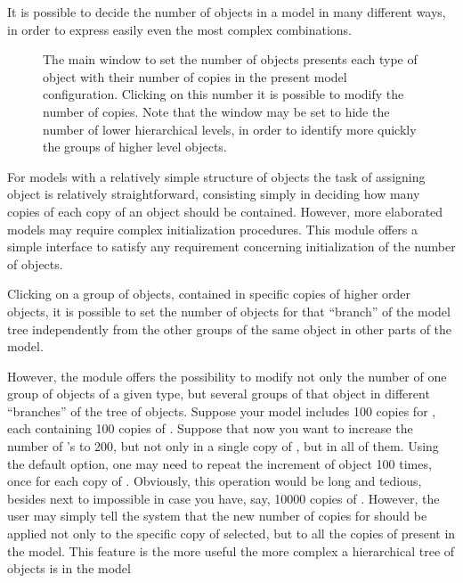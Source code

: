\documentclass [11pt,a4paper] {book}
\begin{document}
It is possible to decide the number of objects in a model in many different ways, in order to express easily even the most complex combinations.

\begin{figure}[ht]
  \centering
  \caption{\small The main window to set the number of objects presents each type of object with their number of copies in the present model configuration. Clicking on this number it is possible to modify the number of copies. Note that the window may be set to hide the number of lower hierarchical levels, in order to identify more quickly the groups of higher level objects.}
  \label{fig:objnum}
\end{figure}

For models with a relatively simple structure of objects the task of assigning object is relatively straightforward, consisting simply in deciding how many copies of each copy of an object should be contained. However, more elaborated models may require complex initialization procedures. This module offers a simple interface to satisfy any requirement concerning initialization of the number of objects.


Clicking on a group of objects, contained in specific copies of higher order objects, it is possible to set the number of objects for that ``branch'' of the model tree independently from the other groups of the same object in other parts of the model.


However, the module offers the possibility to modify not only the number of one group of objects of a given type, but several groups of that object in different ``branches'' of the tree of objects. Suppose your model includes 100 copies for , each containing 100 copies of . Suppose that now you want to increase the number of 's to 200, but not only in a single copy of , but in all of them. Using the default option, one may need to repeat the increment of object 100 times, once for each copy of . Obviously, this operation would be long and tedious, besides next to impossible in case you have, say, 10000 copies of . However, the user may simply tell the system that the new number of copies for  should be applied not only to the specific copy of  selected, but to all the copies of  present in the model. This feature is the more useful the more complex a hierarchical tree of objects is in the model
\end{document}
